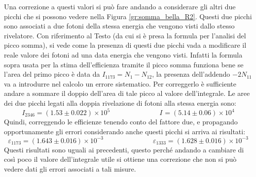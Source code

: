 Una correzione a questi valori si può fare andando a considerare gli altri due picchi che si possono vedere nella Figura \ref{gr:somma_bella_R2}. Questi due picchi sono
associati a due fotoni della stessa energia che vengono visti dallo stesso rivelatore. Con riferimento al Testo \cite{bib:knoll} (da cui si è presa la formula per l'analisi
del picco somma), si vede come la presenza di questi due picchi vada a modificare il reale valore dei fotoni ad una data energia che vengono visti. Infatti la formula
sopra usata per la stima dell'efficienza tramite il picco somma funziona bene se l'area del primo picco è data da $I_{1173}=N_{1}-N_{12}$, la presenza dell'addendo
$-2N_{11}$ va a introdurre nel calcolo un errore sistematico. Per correggerlo è sufficiente andare a sommare il doppio dell'area di tale picco al valore dell'integrale.
Le aree dei due picchi legati alla doppia rivelazione di fotoni alla stessa energia sono:
$$I_{2346} = (1.53\pm 0.022)\times 10^5 \hspace{3cm} I_{} = (5.14 \pm 0.06)\times 10^4 $$
Quindi, correggendo le efficienze tenendo conto del fattore due, e propagando opportunamente gli errori considerando anche questi picchi si arriva ai risultati:
$$\varepsilon_{1173}=(1.643 \pm 0.016)\times 10^{-3} \hspace{3cm} \varepsilon_{1333}=(1.628 \pm 0.016)\times 10^{-3}$$
Questi risultati sono uguali ai precedenti, questo perché andando a cambiare di così poco il valore dell'integrale utile si ottiene una correzione che non si può vedere dati
gli errori associati a tali misure.
